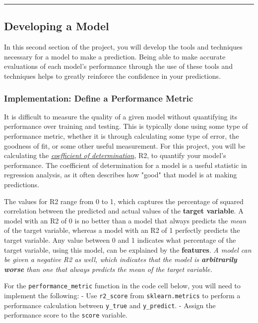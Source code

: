 \documentclass[11pt]{article}
\begin{document}
    \begin{center}\rule{0.5\linewidth}{\linethickness}\end{center}

\subsection{Developing a Model}\label{developing-a-model}

In this second section of the project, you will develop the tools and
techniques necessary for a model to make a prediction. Being able to
make accurate evaluations of each model's performance through the use of
these tools and techniques helps to greatly reinforce the confidence in
your predictions.

    \subsubsection{Implementation: Define a Performance
Metric}\label{implementation-define-a-performance-metric}

It is difficult to measure the quality of a given model without
quantifying its performance over training and testing. This is typically
done using some type of performance metric, whether it is through
calculating some type of error, the goodness of fit, or some other
useful measurement. For this project, you will be calculating the
\href{http://stattrek.com/statistics/dictionary.aspx?definition=coefficient_of_determination}{\emph{coefficient
of determination}}, R2, to quantify your model's performance. The
coefficient of determination for a model is a useful statistic in
regression analysis, as it often describes how "good" that model is at
making predictions.

The values for R2 range from 0 to 1, which captures the percentage of
squared correlation between the predicted and actual values of the
\textbf{target variable}. A model with an R2 of 0 is no better than a
model that always predicts the \emph{mean} of the target variable,
whereas a model with an R2 of 1 perfectly predicts the target variable.
Any value between 0 and 1 indicates what percentage of the target
variable, using this model, can be explained by the \textbf{features}.
\emph{A model can be given a negative R2 as well, which indicates that
the model is \textbf{arbitrarily worse} than one that always predicts
the mean of the target variable.}

For the \texttt{performance\_metric} function in the code cell below,
you will need to implement the following: - Use \texttt{r2\_score} from
\texttt{sklearn.metrics} to perform a performance calculation between
\texttt{y\_true} and \texttt{y\_predict}. - Assign the performance score
to the \texttt{score} variable.
\end{document}
